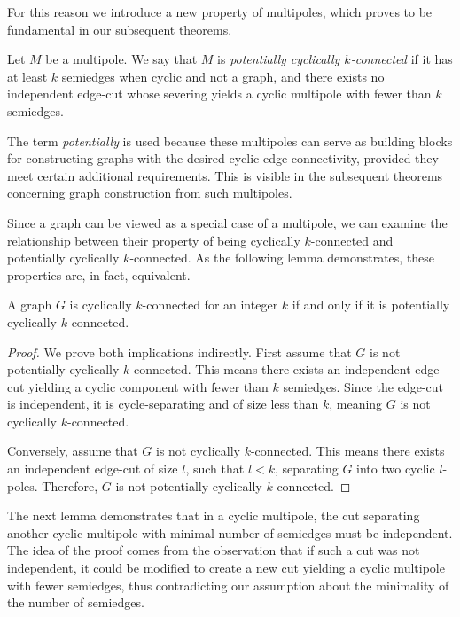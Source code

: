 \documentclass[12pt, twoside]{book}
\begin{document}
For this reason we introduce a new property of multipoles, which proves to be fundamental in our subsequent theorems.

\begin{definition}
	Let $M$ be a multipole. We say that $M$ is \textit{potentially cyclically $k$-connected} if it has at least $k$ semiedges when cyclic and not a graph, and there exists no independent edge-cut whose severing yields a cyclic multipole with fewer than $k$ semiedges.
\end{definition}

The term \textit{potentially} is used because these multipoles can serve as building blocks for constructing graphs with the desired cyclic edge-connectivity, provided they meet certain additional requirements. This is visible in the subsequent theorems concerning graph construction from such multipoles.

Since a graph can be viewed as a special case of a multipole, we can examine the relationship between their property of being cyclically $k$-connected and potentially cyclically $k$-connected. As the following lemma demonstrates, these properties are, in fact, equivalent.

\begin{lemma}\label{lem:graphs-potential-and-normal-cyclic-connected-eq}
	A graph $G$ is cyclically $k$-connected for an integer $k$ if and only if it is potentially cyclically \mbox{$k$-connected}.
\end{lemma}

\begin{proof}
	We prove both implications indirectly. First assume that $G$ is not potentially cyclically $k$-connected. This means there exists an independent edge-cut yielding a cyclic component with fewer than $k$ semiedges. Since the edge-cut is independent, it is \mbox{cycle-separating} and of size less than $k$, meaning $G$ is not cyclically $k$-connected.
	
	Conversely, assume that $G$ is not cyclically \mbox{$k$-connected}. This means there exists an independent edge-cut of size $l$, such that $l<k$, separating $G$ into two cyclic $l$-poles. Therefore, $G$ is not potentially cyclically $k$-connected.
\end{proof}

The next lemma demonstrates that in a cyclic multipole, the cut separating another cyclic multipole with minimal number of semiedges must be independent. The idea of the proof comes from the observation that if such a cut was not independent, it could be modified to create a new cut yielding a cyclic multipole with fewer semiedges, thus contradicting our assumption about the minimality of the number of semiedges.
\end{document}
